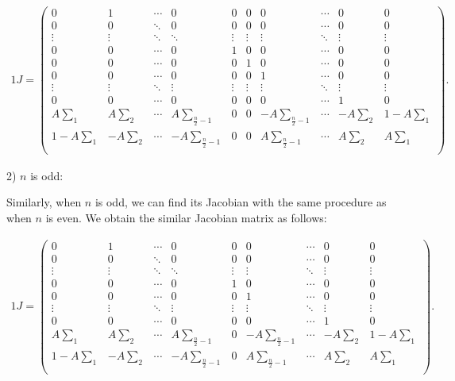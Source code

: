 \begin{alignat}{1}
J=\begin{pmatrix}
 0 & 1  & \cdots & 0 & 0 & 0 & 0 & \cdots & 0 & 0\\ 
 0 & 0  & \ddots & 0 & 0 & 0 & 0 & \cdots & 0 & 0\\  
\vdots & \vdots & \ddots & \ddots & \vdots & \vdots & \vdots & \ddots & \vdots & \vdots\\
 0 & 0  & \cdots & 0 & 1 & 0 & 0 & \cdots & 0 & 0\\  
 0 & 0  & \cdots & 0 & 0 & 1 & 0 & \cdots & 0 & 0\\  
 0 & 0 & \cdots & 0 & 0 & 0 & 1 & \cdots & 0 & 0\\  
\vdots & \vdots & \ddots & \vdots & \vdots & \vdots & \vdots & \ddots & \vdots & \vdots\\
 0 & 0  & \cdots & 0 & 0 & 0 & 0 & \cdots & 1 & 0 \\ 
A\sum\limits_{1} & A\sum\limits_{2} & \cdots &  A\sum\limits_{\frac{n}{2}-1} & 0 & 0 & - A\sum\limits_{\frac{n}{2}-1}& \cdots & - A\sum\limits_{2} & 1 - A\sum\limits_{1} \\  
1 - A\sum\limits_{1} & - A\sum\limits_{2} & \cdots &  - A\sum\limits_{\frac{n}{2}-1} & 0 & 0 &  A\sum\limits_{\frac{n}{2}-1}& \cdots & A\sum\limits_{2} & A\sum\limits_{1} \\  
\end{pmatrix}.
\end{alignat}

2) $n$ is odd:

Similarly, when $n$ is odd, we can find its Jacobian with the same procedure as when $n$ is even.
We obtain the similar Jacobian matrix as follows: 

\begin{alignat}{1}
J=\begin{pmatrix}
 0 & 1  & \cdots & 0 & 0 & 0 & \cdots & 0 & 0\\ 
 0 & 0  & \ddots & 0 & 0 & 0 & \cdots & 0 & 0\\  
\vdots & \vdots & \ddots & \ddots & \vdots & \vdots & \ddots & \vdots & \vdots\\
 0 & 0  & \cdots & 0 & 1  & 0 & \cdots & 0 & 0\\  
 0 & 0  & \cdots & 0 & 0 & 1 & \cdots & 0 & 0\\  
\vdots & \vdots & \ddots & \vdots & \vdots & \vdots & \ddots & \vdots & \vdots\\
 0 & 0  & \cdots & 0 & 0 & 0 & \cdots & 1 & 0 \\ 
A\sum\limits_{1} & A\sum\limits_{2} & \cdots &  A\sum\limits_{\frac{n}{2}-1} & 0 & - A\sum\limits_{\frac{n}{2}-1}& \cdots & - A\sum\limits_{2} & 1 - A\sum\limits_{1} \\  
1 - A\sum\limits_{1} & - A\sum\limits_{2} & \cdots &  - A\sum\limits_{\frac{n}{2}-1} & 0 &  A\sum\limits_{\frac{n}{2}-1}& \cdots & A\sum\limits_{2} & A\sum\limits_{1} \\  
\end{pmatrix}.
\end{alignat}


